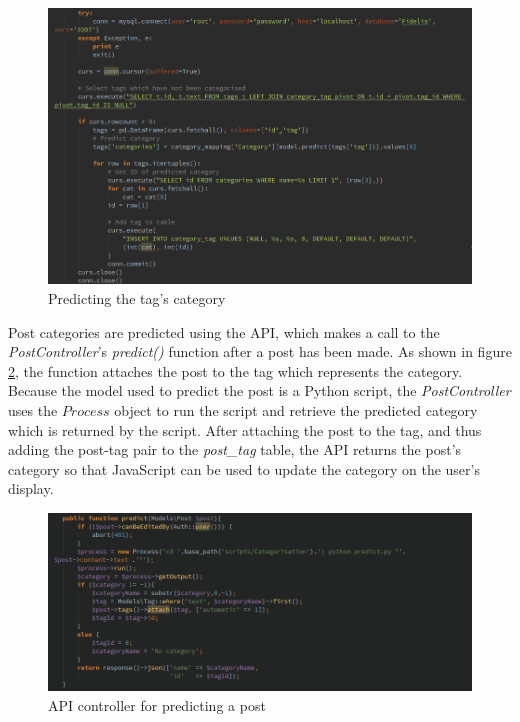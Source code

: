 \begin{figure}[H]
\centering
\includegraphics[width=\textwidth]{Images/Implementation/predict-tag}
\caption{Predicting the tag's category}
\label{fig:predict-tag}
\end{figure}

Post categories are predicted using the API, which makes a call to the \emph{PostController}'s \textit{predict()} function after a post has been made. As shown in figure \ref{fig:predict-api}, the function attaches the post to the tag which represents the category. Because the model used to predict the post is a Python script, the \emph{PostController} uses the $Process$ object to run the script and retrieve the predicted category which is returned by the script. After attaching the post to the tag, and thus adding the post-tag pair to the \emph{post\_tag} table, the API returns the post's category so that JavaScript can be used to update the category on the user's display. 

\begin{figure}[H]
\centering
\includegraphics[width=\textwidth]{Images/Implementation/predict-api}
\caption{API controller for predicting a post}
\label{fig:predict-api}
\end{figure}

